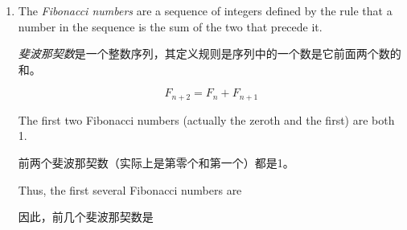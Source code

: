 \begin{enumerate}
{\begin{proof}
  \[ \sum_{i=1}^{k+1} \frac{1}{(2i-1)(2i+1)} \; = \; \frac{k}{2k+1} \; + \; \frac{1}{(2(k+1)-1)(2(k+1)+1)}.
  \]
  
  To complete the proof we must verify that 
  
  为了完成证明，我们必须验证
  
  \[ \frac{k}{2k+1} \; + \; \frac{1}{(2(k+1)-1)(2(k+1)+1)} = \frac{k+1}{2(k+1)+1}. \]
  
  Note that
  
  注意到
  
  \begin{gather*}
  \rule{0pt}{23pt} \frac{k}{2k+1} \; + \; \frac{1}{(2(k+1)-1)(2(k+1)+1)} \\
  \rule{0pt}{23pt} = \frac{k}{2k+1} \; + \; \frac{1}{(2k+1)(2k+3)}\\
  \rule{0pt}{23pt} = \frac{k(2k+3)}{(2k+1)(2k+3)} \; + \; \frac{1}{(2k+1)(2k+3)}\\
  \rule{0pt}{23pt} = \frac{k(2k+3)+1}{(2k+1)(2k+3)} \\
  \rule{0pt}{23pt} = \frac{2k^2+3k+1}{(2k+1)(2k+3)} \\
  \rule{0pt}{23pt} = \frac{(2k+1)(k+1)}{(2k+1)(2k+3)} \\
  \rule{0pt}{23pt} = \frac{k+1}{2k+3} \; = \; \frac{k+1}{2(k+1)+1}
  \end{gather*}
  
  \noindent as desired.
  
  \noindent 如所愿。
  \end{proof}
  
  }
  \wbvfill
  
  \workbookpagebreak
  
  \item The  \emph{Fibonacci numbers} are a sequence of integers defined by
  the rule that a number in the sequence is the sum of the two that 
  precede it.
  
  \emph{斐波那契数}是一个整数序列，其定义规则是序列中的一个数是它前面两个数的和。
  
  \[ F_{n+2} = F_n + F_{n+1}  \]
  
  \noindent The first two Fibonacci numbers (actually the zeroth and the first) 
  are both 1.  
  
  \noindent 前两个斐波那契数（实际上是第零个和第一个）都是1。
  
  \noindent Thus, the first several Fibonacci numbers are
  
  \noindent 因此，前几个斐波那契数是
  

\end{enumerate}
